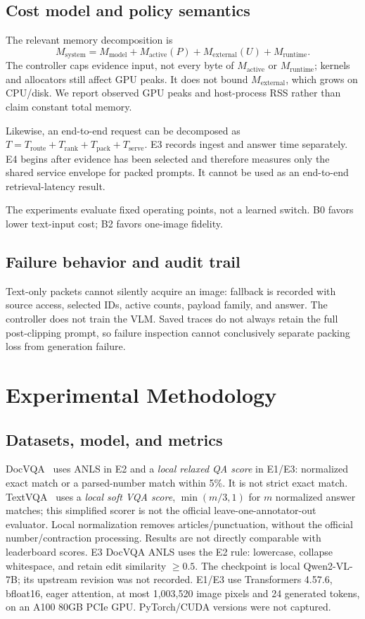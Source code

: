 ﻿\documentclass[conference]{IEEEtran}
\newcommand{\bzero}{\textsc{B0}\xspace}
\newcommand{\btwo}{\textsc{B2}\xspace}
\begin{document}
\subsection{Cost model and policy semantics}
The relevant memory decomposition is
\begin{equation}
M_{\mathrm{system}}=M_{\mathrm{model}}+M_{\mathrm{active}}(P)+M_{\mathrm{external}}(U)+M_{\mathrm{runtime}}.
\end{equation}
The controller caps evidence input, not every byte of $M_{\mathrm{active}}$ or $M_{\mathrm{runtime}}$; kernels and allocators still affect GPU peaks. It does not bound $M_{\mathrm{external}}$, which grows on CPU/disk. We report observed GPU peaks and host-process RSS rather than claim constant total memory.

Likewise, an end-to-end request can be decomposed as $T=T_{\mathrm{route}}+T_{\mathrm{rank}}+T_{\mathrm{pack}}+T_{\mathrm{serve}}$. E3 records ingest and answer time separately. E4 begins after evidence has been selected and therefore measures only the shared service envelope for packed prompts. It cannot be used as an end-to-end retrieval-latency result.

The experiments evaluate fixed operating points, not a learned switch. \bzero favors lower text-input cost; \btwo favors one-image fidelity.

\subsection{Failure behavior and audit trail}
Text-only packets cannot silently acquire an image: fallback is recorded with source access, selected IDs, active counts, payload family, and answer. The controller does not train the VLM. Saved traces do not always retain the full post-clipping prompt, so failure inspection cannot conclusively separate packing loss from generation failure.

\section{Experimental Methodology}
\subsection{Datasets, model, and metrics}
DocVQA~\cite{mathew2021docvqa} uses ANLS in E2 and a \emph{local relaxed QA score} in E1/E3: normalized exact match or a parsed-number match within 5\%. It is not strict exact match. TextVQA~\cite{singh2019textvqa} uses a \emph{local soft VQA score}, $\min(m/3,1)$ for $m$ normalized answer matches; this simplified scorer is not the official leave-one-annotator-out evaluator. Local normalization removes articles/punctuation, without the official number/contraction processing. Results are not directly comparable with leaderboard scores. E3 DocVQA ANLS uses the E2 rule: lowercase, collapse whitespace, and retain edit similarity $\geq0.5$. The checkpoint is local Qwen2-VL-7B; its upstream revision was not recorded. E1/E3 use Transformers 4.57.6, bfloat16, eager attention, at most 1,003,520 image pixels and 24 generated tokens, on an A100 80GB PCIe GPU. PyTorch/CUDA versions were not captured.
\end{document}
